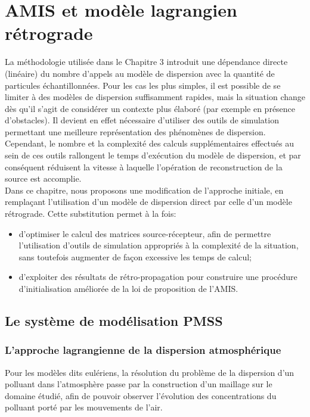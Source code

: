 \chapter{{AMIS et modèle lagrangien rétrograde}}

{La méthodologie utilisée dans le Chapitre 3 introduit une dépendance directe (linéaire) du nombre d'appels au modèle de dispersion avec la quantité de particules échantillonnées. Pour les cas les plus simples, il est possible de se limiter à des modèles de dispersion suffisamment rapides, mais la situation change dès qu'il s'agit de considérer un contexte plus élaboré (par exemple en présence d'obstacles). Il devient en effet nécessaire d'utiliser des outils de simulation permettant une meilleure représentation des phénomènes de dispersion. Cependant, le nombre et la complexité des calculs supplémentaires effectués au sein de ces outils rallongent le temps d'exécution du modèle de dispersion, et par conséquent réduisent la vitesse à laquelle l'opération de reconstruction de la source est accomplie.\\
	
	Dans ce chapitre, nous proposons une modification de l'approche initiale, en remplaçant l'utilisation d'un modèle de dispersion direct par celle d'un modèle rétrograde. Cette substitution permet à la fois:\\
	\begin{itemize}
		\item d'optimiser le calcul des matrices source-récepteur, afin de permettre l'utilisation d'outils de simulation appropriés à la complexité de la situation, sans toutefois augmenter de façon excessive les temps de calcul;
		\item d'exploiter des résultats de rétro-propagation pour construire une procédure d'initialisation améliorée de la loi de proposition de l'AMIS. \\
	\end{itemize}
}
{
\section{Le système de modélisation PMSS}
}
\subsection{L'approche lagrangienne de la dispersion atmosphérique}
\label{part_lagrangian}

Pour les modèles dits eulériens, la résolution du problème de la dispersion d'un polluant dans l'atmosphère passe par la construction d'un maillage sur le domaine étudié, afin de pouvoir observer l'évolution des concentrations du polluant porté par les mouvements de l'air. 

